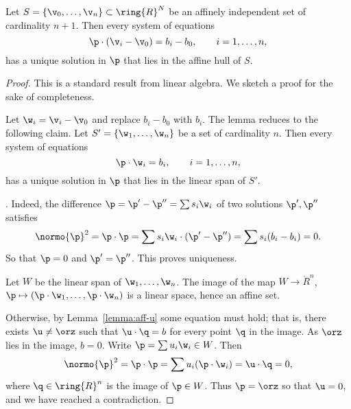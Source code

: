 \begin{lemma}\label{lemma:affine-system} 
  Let $S=\{\v_0,\ldots,\v_n\}\subset \ring{R}^N$ be an affinely
  independent set of cardinality $n+1$.  Then every system of
  equations
\begin{displaymath} 
\p \cdot (\v_i - \v_0) = b_i-b_0,\qquad i=1,\ldots,n,
\end{displaymath}
has a unique solution in $\p$ that lies in the affine hull of $S$.
\end{lemma}

\begin{proof} This is a standard result from linear algebra.
We sketch a proof for the sake of completeness.  

Let $\w_i = \v_i-\v_0$ and replace $b_i-b_0$ with $b_i$.  
The lemma reduces to the following claim.
Let $S' = \{\w_1,\ldots,\w_n\}$ be a  set
of cardinality $n$.  Then every system of equations
\begin{displaymath} 
\p \cdot \w_i = b_i,\qquad i=1,\ldots,n,
\end{displaymath}
has a unique solution in $\p$ that lies in the linear span of $S'$.

. Indeed, the difference 
$\p = \p'-\p'' = \sum s_i \w_i$ of two solutions
$\p',\p''$ satisfies
\begin{displaymath} 
\normo{\p}^2=\p\cdot\p = \sum s_i \w_i \cdot (\p' - \p'') =
\sum s_i (b_i-b_i)= 0.
\end{displaymath}
So that $\p=0$ and $\p'=\p''$.  This proves uniqueness.

Let $W$ be the linear span of $\w_1,\ldots,\w_n$.  The image of the
map $W\to\ring{R}^n$, $\p\mapsto (\p\cdot\w_1,\ldots,\p\cdot\w_n)$ is
a linear space, hence an affine set.

Otherwise, by Lemma~\ref{lemma:aff-u} some equation must hold; that
is, there exists $\u\ne \orz$ such that $\u\cdot \q =b$ for every
point $\q$ in the image.  As $\orz$ lies in the image, $b=0$.  Write
$\p = \sum u_i \w_i\in W$.  Then
\begin{displaymath} 
\normo{\p}^2 = \p\cdot\p = \sum u_i (\p \cdot \w_i) = \u\cdot \q = 0,
\end{displaymath} 
where $\q\in\ring{R}^n$ is the image of $\p\in W$.
Thus $\p=\orz$ so that $\u=0$, and we have reached a contradiction.
\end{proof}

